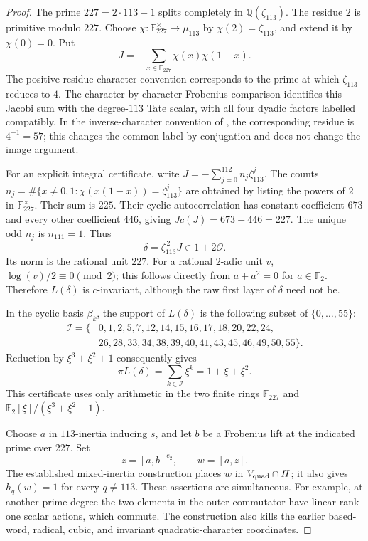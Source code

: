 \begin{proof}
The prime \(227=2\cdot113+1\) splits completely in
\(\mathbb Q(\zeta_{113})\). The residue \(2\) is primitive
modulo \(227\). Choose \(\chi:\mathbb F_{227}^{\times}
\to\mu_{113}\) by \(\chi(2)=\zeta_{113}\), and extend it
by \(\chi(0)=0\). Put
\[
 J=-\sum_{x\in\mathbb F_{227}}\chi(x)\chi(1-x).
\]
The positive residue-character convention corresponds to
the prime at which \(\zeta_{113}\) reduces to \(4\).
The character-by-character Frobenius comparison
\cite[Theorem~8.1, Remark~8.3, Corollary~8.4]{Otsubo2016}
identifies this Jacobi sum with the degree-\(113\) Tate scalar,
with all four dyadic factors labelled compatibly.
In the inverse-character convention of
\cite[definition on p.~201; Lemma~5.1 and its proof]{AnglesNuccio},
the corresponding residue is \(4^{-1}=57\); this changes
the common label by conjugation and does not change the
image argument.

For an explicit integral certificate, write
\(J=-\sum_{j=0}^{112}n_j\zeta_{113}^j\). The counts
\(n_j=\#\{x\ne0,1:\chi(x(1-x))=\zeta_{113}^j\}\)
are obtained by listing the powers of \(2\) in
\(\mathbb F_{227}^{\times}\). Their sum is \(225\).
Their cyclic autocorrelation has constant coefficient
\(673\) and every other coefficient \(446\), giving
\(Jc(J)=673-446=227\).
The unique odd \(n_j\) is \(n_{111}=1\).
Thus
\[
 \delta=\zeta_{113}^{\,2}J\in1+2\mathcal O.
\]
Its norm is the rational unit \(227\). For a rational
\(2\)-adic unit \(v\), \(\log(v)/2\equiv0\pmod2\);
this follows directly from \(a+a^2=0\) for
\(a\in\mathbb F_2\). Therefore \(L(\delta)\) is
\(c\)-invariant, although the raw first layer of \(\delta\)
need not be.

In the cyclic basis \(\beta_k\), the support of
\(L(\delta)\) is the following subset of \(\{0,\ldots,55\}\):
\[
\begin{split}
 \mathcal I=\{&
 0,1,2,5,7,12,14,15,16,17,18,20,22,24,\\
 &26,28,33,34,38,39,40,41,43,45,46,49,50,55\}.
\end{split}
\]
Reduction by \(\xi^3+\xi^2+1\) consequently gives
\begin{equation}
 \pi L(\delta)=\sum_{k\in\mathcal I}\xi^k
             =1+\xi+\xi^2.
 \label{eq:113-jacobi-detector}
\end{equation}
This certificate uses only arithmetic in the two finite
rings \(\mathbb F_{227}\) and
\(\mathbb F_2[\xi]/(\xi^3+\xi^2+1)\).

Choose \(a\) in \(113\)-inertia inducing \(s\), and let \(b\)
be a Frobenius lift at the indicated prime over \(227\).
Set
\[
 z=[a,b]^{e_2},\qquad w=[a,z].
\]
The established mixed-inertia construction places \(w\)
in \(V_{\rm quad}\cap H\); it also gives \(h_q(w)=1\)
for every \(q\ne113\). These assertions are simultaneous.
For example, at another prime degree the two elements
in the outer commutator have linear rank-one scalar
actions, which commute. The construction also kills the
earlier based-word, radical, cubic, and invariant
quadratic-character coordinates.


\end{proof}
